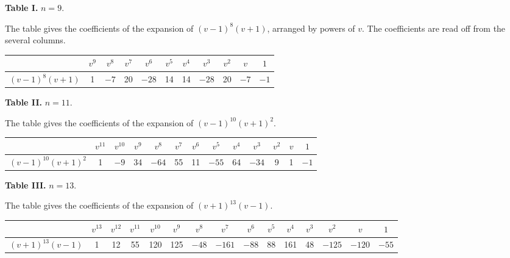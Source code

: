 \documentclass[11pt,a4paper]{book}
\begin{document}
\medskip

\noindent\textbf{Table I.} $n = 9$.

\medskip

\noindent
The table gives the coefficients of the expansion of $(v-1)^8(v+1)$, arranged by powers of $v$. The coefficients are read off from the several columns.

\begin{center}
\begin{tabular}{|c|c|c|c|c|c|c|c|c|c|c|}
\hline
& $v^9$ & $v^8$ & $v^7$ & $v^6$ & $v^5$ & $v^4$ & $v^3$ & $v^2$ & $v$ & $1$ \\
\hline
$(v-1)^8(v+1)$ & 1 & $-7$ & 20 & $-28$ & 14 & 14 & $-28$ & 20 & $-7$ & $-1$ \\
\hline
\end{tabular}
\end{center}

\medskip

\noindent\textbf{Table II.} $n = 11$.

\medskip

\noindent
The table gives the coefficients of the expansion of $(v-1)^{10}(v+1)^2$.

\begin{center}
\begin{tabular}{|c|c|c|c|c|c|c|c|c|c|c|c|c|}
\hline
& $v^{11}$ & $v^{10}$ & $v^9$ & $v^8$ & $v^7$ & $v^6$ & $v^5$ & $v^4$ & $v^3$ & $v^2$ & $v$ & $1$ \\
\hline
$(v-1)^{10}(v+1)^2$ & 1 & $-9$ & 34 & $-64$ & 55 & 11 & $-55$ & 64 & $-34$ & 9 & 1 & $-1$ \\
\hline
\end{tabular}
\end{center}

\medskip

\noindent\textbf{Table III.} $n = 13$.

\medskip

\noindent
The table gives the coefficients of the expansion of $(v+1)^{13}(v-1)$.

\begin{center}
\begin{tabular}{|c|c|c|c|c|c|c|c|c|c|c|c|c|c|c|}
\hline
& $v^{13}$ & $v^{12}$ & $v^{11}$ & $v^{10}$ & $v^9$ & $v^8$ & $v^7$ & $v^6$ & $v^5$ & $v^4$ & $v^3$ & $v^2$ & $v$ & $1$ \\
\hline
$(v+1)^{13}(v-1)$ & 1 & 12 & 55 & 120 & 125 & $-48$ & $-161$ & $-88$ & 88 & 161 & 48 & $-125$ & $-120$ & $-55$ \\
\hline
\end{tabular}
\end{center}
\end{document}
